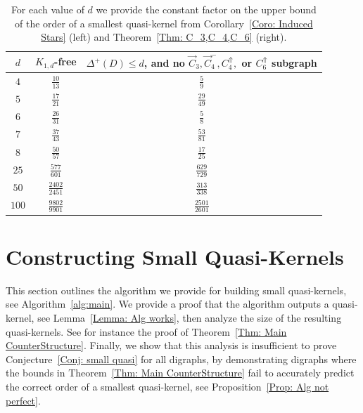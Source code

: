 \documentclass[12pt]{article}
\theoremstyle{definition}
\begin{document}
\renewcommand{\arraystretch}{1.5}
\begin{table}[!h]
\centering
\begin{tabular}{| c | c | c |} 
\hline \hline
$d$ & $K_{1,d}$-free & $\Delta^+(D) \leq d$, and no $\Vec{C}_3, \Vec{C}^{-}_4,C_4^{\Uparrow},$ or $C_6^{\Uparrow}$ subgraph \\ \hline \hline 
$4$ &  $\frac{10}{13}$ & $\frac{5}{9}$\\ \hline
$5$ & $\frac{17}{21}$ &  $\frac{29}{49}$\\ \hline
$6$ & $\frac{26}{31}$ &  $\frac{5}{8}$\\ \hline
$7$ & $\frac{37}{43}$  &  $\frac{53}{81}$ \\ \hline
$8$ & $\frac{50}{57}$  & $\frac{17}{25}$\\ \hline
$25$ & $\frac{577}{601}$ & $\frac{629}{729}$\\ \hline 
$50$ & $\frac{2402}{2451}$ &  $\frac{313}{338}$ \\ \hline
$100$ & $\frac{9802}{9901}$ & $\frac{2501}{2601}$ \\ \hline \hline
\end{tabular}
\caption{
For each value of $d$ we provide the constant factor on the upper bound of the order of a smallest quasi-kernel
from Corollary~\ref{Coro: Induced Stars} (left) and Theorem~\ref{Thm: C_3,C_4,C_6} (right).
}
\label{table:ratios}
\end{table}




\section{Constructing Small Quasi-Kernels}

This section outlines the algorithm we provide for building small quasi-kernels,
see Algorithm~\ref{alg:main}.
We provide a proof that the algorithm outputs a quasi-kernel, see Lemma~\ref{Lemma: Alg works},
then analyze
the size of the resulting quasi-kernels.
See for instance the proof of Theorem~\ref{Thm: Main CounterStructure}.
Finally, we show that this analysis is insufficient to prove Conjecture~\ref{Conj: small quasi}
for all digraphs, by demonstrating digraphs
where the bounds in 
Theorem~\ref{Thm: Main CounterStructure}
fail to accurately predict the correct order of a smallest quasi-kernel,
see Proposition~\ref{Prop: Alg not perfect}.
\end{document}

